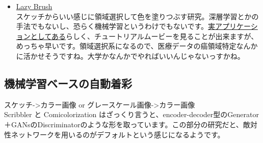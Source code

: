 \documentclass[a4paper, dvipdfmx, 10pt]{article}
\begin{document}
\begin{itemize}
\item \href{https://dcgi.fel.cvut.cz/home/sykorad/Sykora09-EG.pdf}{Lazy Brush}\\

スケッチからいい感じに領域選択して色を塗りつぶす研究。深層学習とかの手法でもないし、恐らく機械学習というわけでもないです。\href{http://animatetvp.blogspot.com/2015/01/lazybrush.html}{実アプリケーションとしてある}らしく、チュートリアルムービーを見ることが出来ますが、めっちゃ早いです。領域選択系になるので、医療データの癌領域特定なんかに活かせそうですね。大学かなんかでやればいいんじゃないっすかね。\\
\end{itemize}

\subsection{機械学習ベースの自動着彩}
\label{sec:orgf583cac}
スケッチ->カラー画像 or グレースケール画像->カラー画像\\
Scribbler と Comicolorization はざっくり言うと、encoder-decoder型のGenerator＋GANsのDiscriminatorのような形を取っています。この部分の研究だと、敵対性ネットワークを用いるのがデフォルトという感じになるようです。\\
\end{document}

